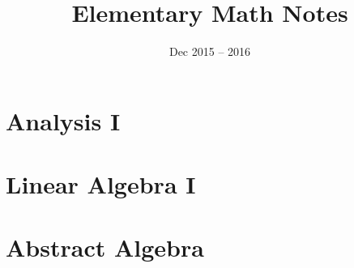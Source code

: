 \documentclass{article}
\title{Elementary Math Notes}
\date{Dec 2015 -- 2016}
\def\genpart#1#2{
\part{#1}
\parttoc
\newpage

\newpage}
\begin{document}
\doparttoc

\maketitle

\newpage
\setcounter{tocdepth}{1}
\tableofcontents
\newpage

\genpart{Analysis I}{analysis1}
\genpart{Linear Algebra I}{linear1}
\genpart{Abstract Algebra}{algebra2}
\end{document}
